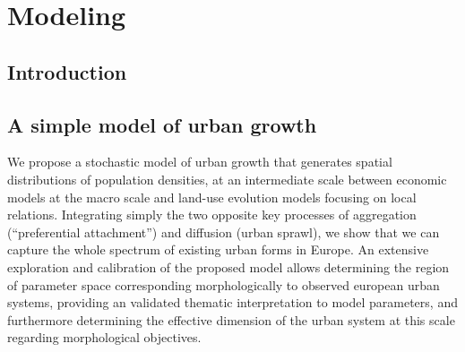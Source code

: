 


\chapter{Modeling} %

\label{ch:modeling} %






\section*{Introduction}
















\section{A simple model of urban growth}



We propose a stochastic model of urban growth that generates spatial distributions of population densities, at an intermediate scale between economic models at the macro scale and land-use evolution models focusing on local relations. Integrating simply the two opposite key processes of aggregation (“preferential attachment”) and diffusion (urban sprawl), we show that we can capture the whole spectrum of existing urban forms in Europe. An extensive exploration and calibration of the proposed model allows determining the region of parameter space corresponding morphologically to observed european urban systems, providing an validated thematic interpretation to model parameters, and furthermore determining the effective dimension of the urban system at this scale regarding morphological objectives.




